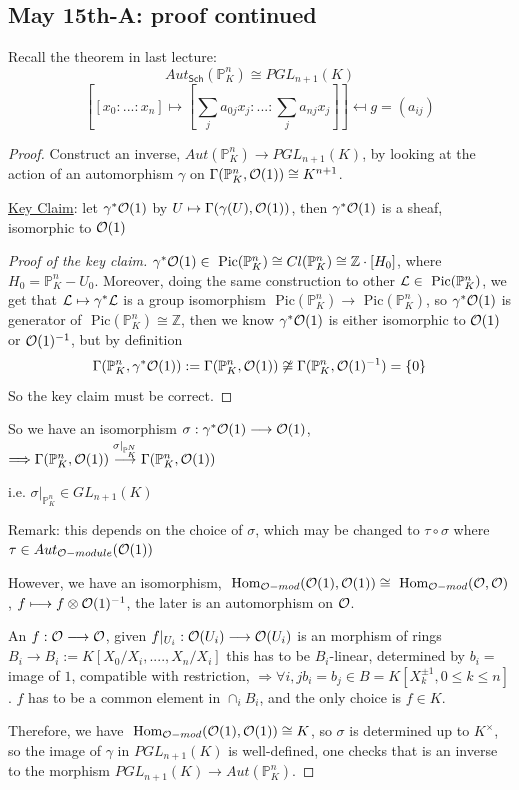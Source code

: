\documentclass[11pt]{article}
\renewcommand{\hom}{\text{ Hom}}
\newcommand{\pic}{\text{ Pic}}
\newcommand{\proj}{\mathbb P}
\newcommand{\intg}{\mathbb Z}
\newcommand{\call}{{\cal L}}
\newcommand{\calo}{{\cal O}}
\newcommand{\Lrta}{\Longrightarrow}
\newcommand{\lrta}{\longrightarrow}
\begin{document}
\subsection{May 15th-A: proof continued}
Recall the theorem in last lecture:
$$
Aut_{\mathsf{Sch}}(\proj^n_K)\cong PGL_{n+1}(K)
$$
$$
\left[[x_0:...:x_n]\mapsto [\sum_j a_{0j}x_j:...:\sum_j a_{nj}x_j]\right]\mapsfrom g=(a_{ij})
$$
\begin{proof}
Construct an inverse, $Aut(\proj^n_K)\lrta PGL_{n+1}(K)$, by looking at the action of an automorphism $\gamma$ on $\Gamma(\proj^n_K,\calo(1))\cong K^{n+1}$.

\underline{Key Claim}: let $\gamma^*\calo(1)$
 by $U\mapsto \Gamma(\gamma(U),\calo(1))$, then $\gamma^*\calo(1)$ is a sheaf, isomorphic to $\calo(1)$
\begin{proof}[Proof of the key claim]
$\gamma^*\calo(1)\in \pic(\proj^n_K)\cong Cl(\proj^n_K)\cong \intg\cdot [H_0]$, where $H_0=\proj^n_K-U_0$.  Moreover, doing the same construction to other $\call\in \pic(\proj^n_K)$, we get that $\call\mapsto \gamma^*\call$ is a group isomorphism $\pic(\proj^n_K)\lrta \pic(\proj^n_K)$, so $\gamma^*\calo(1)$ is generator of $\pic(\proj^n_K)\cong \intg$, then we know $\gamma^*\calo(1)$ is either isomorphic to $\calo(1)$ or $\calo(1)^{-1}$, but by definition
$$
\Gamma(\proj^n_K,\gamma^*\calo(1)):=\Gamma(\proj^n_K,\calo(1))\not\cong \Gamma(\proj^n_K,\calo(1)^{-1})=\{0\}
$$
So the key claim must be correct.
\end{proof}

So we have an isomorphism $\sigma:\gamma^*\calo(1)\lrta \calo(1)$, $\Lrta \Gamma(\proj^n_K,\calo(1))\overset{\sigma|_{\proj^N_K}}{\lrta}\Gamma(\proj^n_K,\calo(1))$

i.e. $\sigma|_{\proj^n_K}\in GL_{n+1}(K)$

Remark: this depends on the choice of $\sigma$, which may be changed to $\tau\circ \sigma$ where $\tau\in Aut_{\calo-module}(\calo(1))$

However, we have an isomorphism, $\hom_{\calo-mod}(\calo(1),\calo(1))\cong \hom_{\calo-mod}(\calo,\calo)$, $f\longmapsto f\otimes\calo(1)^{-1}$, the later is an automorphism on $\calo$.

An $f:\calo\lrta\calo$, given $f|_{U_i}:\calo(U_i)\lrta\calo(U_i)$ is an  morphism of rings $B_i\lrta B_i:=K[X_0/X_i,....,X_n/X_i]$ this has to be $B_i$-linear, determined by $b_i=$image of $1$, compatible with restriction, $\Lrta \forall i,j b_i=b_j\in B=K[X_k^{\pm 1}, 0\leq k\leq n]$. $f$ has to be a common element in $\cap_{i} B_i$, and the only choice is $f\in K$.

Therefore, we have $\hom_{\calo-mod}(\calo(1),\calo(1))\cong K$, so $\sigma$ is determined up to $K^\times$, so the image of $\gamma$ in $PGL_{n+1}(K)$ is well-defined, one checks that is an inverse to the morphism $PGL_{n+1}(K)\lrta Aut(\proj^n_K)$.
 \end{proof}
\end{document}
